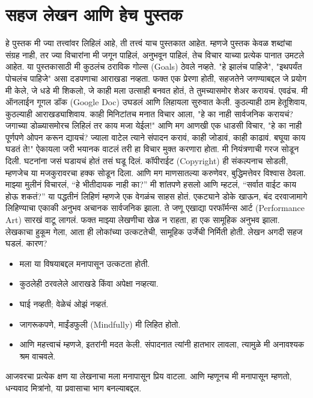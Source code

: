  \chapter{सहज लेखन आणि हेच पुस्तक}
हे पुस्तक मी ज्या तत्त्वांवर लिहिलं आहे, ती तत्त्वं याच पुस्तकात आहेत. म्हणजे पुस्तक केवळ शब्दांचा संग्रह नाही, तर ज्या विचारांना मी जगून पाहिलं, अनुभवून पाहिलं, तेच विचार याच्या प्रत्येक पानात उमटले आहेत.
या पुस्तकासाठी मी कुठलंच ठराविक गोल्स (Goals) ठेवले नव्हते. "हे झालंच पाहिजे", "इथपर्यंत पोचलंच पाहिजे" असा दडपणाचा आराखडा नव्हता. फक्त एक प्रेरणा होती,  सहजतेने जगण्याबद्दल जे प्रयोग मी केले, जे धडे मी शिकलो, जे काही मला उत्साही बनवत होतं, ते तुमच्यासमोर शेअर करायचं. एवढंच.
मी ऑनलाईन गूगल डॉक (Google Doc) उघडलं आणि लिहायला सुरुवात केली. कुठल्याही ठाम हेतूशिवाय, कुठल्याही आराखड्याशिवाय. काही मिनिटांतच मनात विचार आला,  "हे का नाही सार्वजनिक करायचं? जगाच्या डोळ्यासमोरच लिहिलं तर काय मजा येईल!" आणि मग आणखी एक धाडसी विचार,  "हे का नाही पूर्णपणे ओपन करून द्यायचं? ज्याला वाटेल त्याने संपादन करावं, काही जोडावं, काही काढावं. बघूया काय घडतं ते!"
ऐकायला जरी भयानक वाटलं तरी हा विचार मुक्त करणारा होता. मी नियंत्रणाची गरज सोडून दिली. घटनांना जसं घडायचं होतं तसं घडू दिलं. कॉपीराईट (Copyright) ही संकल्पनाच सोडली, म्हणजेच या मजकुरावरचा हक्क सोडून दिला. आणि मग माणसातल्या करुणेवर, बुद्धिमत्तेवर विश्वास ठेवला.
माझ्या मुलीनं विचारलं, ``हे भीतीदायक नाही का?''
 मी शांतपणे हसलो आणि म्हटलं, ``सर्वात वाईट काय होऊ शकतं?''
या पद्धतीनं लिहिणं म्हणजे एक वेगळंच साहस होतं. एकट्याने डोके खाऊन, बंद दरवाजामागे लिहिण्याचा एकाकी अनुभव अचानक सार्वजनिक झाला. ते जणू एखाद्या परफॉर्मन्स आर्ट (Performance Art) सारखं वाटू लागलं. फक्त माझ्या लेखणीचा खेळ न राहता, हा एक सामूहिक अनुभव झाला. लेखकाचा हुकूम गेला, आता ही लोकांच्या उत्कटतेची, सामूहिक उर्जेची निर्मिती होती.
लेखन अगदी सहज घडलं. कारण?
 \begin{itemize}
 \item मला या विषयाबद्दल मनापासून उत्कटता होती.
 \item कुठलेही ठरवलेले आराखडे किंवा अपेक्षा नव्हत्या.
 \item घाई नव्हती; वेळेचं ओझं नव्हतं.
 \item जागरूकपणे, माईंडफुली (Mindfully) मी लिहित होतो.
 \item आणि महत्त्वाचं म्हणजे, इतरांनी मदत केली. संपादनात त्यांनी हातभार लावला, त्यामुळे मी अनावश्यक श्रम वाचवले.
 \end{itemize}
आजवरचा प्रत्येक क्षण या लेखनाचा मला मनापासून प्रिय वाटला. आणि म्हणूनच मी मनापासून म्हणतो,  धन्यवाद मित्रांनो, या प्रवासाचा भाग बनल्याबद्दल.

